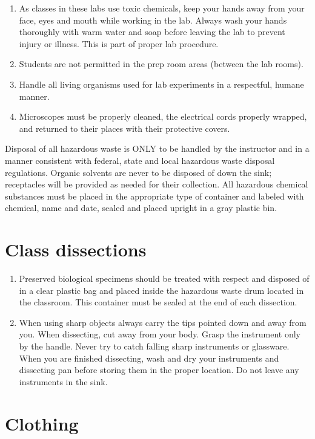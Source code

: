 \documentclass[]{book}
\providecommand{\tightlist}{%
  \setlength{\itemsep}{0pt}\setlength{\parskip}{0pt}}
\theoremstyle{definition}
\theoremstyle{definition}
\theoremstyle{definition}
\theoremstyle{remark}
\begin{document}
\begin{enumerate}
\item
  As classes in these labs use toxic chemicals, keep your hands away
  from your face, eyes and mouth while working in the lab. Always wash
  your hands thoroughly with warm water and soap before leaving the lab
  to prevent injury or illness. This is part of proper lab procedure.
\item
  Students are not permitted in the prep room areas (between the lab
  rooms).
\item
  Handle all living organisms used for lab experiments in a respectful,
  humane manner.
\item
  Microscopes must be properly cleaned, the electrical cords properly
  wrapped, and returned to their places with their protective covers.
\end{enumerate}

Disposal of all hazardous waste is ONLY to be handled by the instructor
and in a manner consistent with federal, state and local hazardous waste
disposal regulations. Organic solvents are never to be disposed of down
the sink; receptacles will be provided as needed for their collection.
All hazardous chemical substances must be placed in the appropriate type
of container and labeled with chemical, name and date, sealed and placed
upright in a gray plastic bin.

\section{Class dissections}\label{class-dissections}

\begin{enumerate}
\def\labelenumi{\arabic{enumi}.}
\setcounter{enumi}{13}
\tightlist
\item
  Preserved biological specimens should be treated with respect and
  disposed of in a clear plastic bag and placed inside the hazardous
  waste drum located in the classroom. This container must be sealed at
  the end of each dissection.
\item
  When using sharp objects always carry the tips pointed down and away
  from you. When dissecting, cut away from your body. Grasp the
  instrument only by the handle. Never try to catch falling sharp
  instruments or glassware. When you are finished dissecting, wash and
  dry your instruments and dissecting pan before storing them in the
  proper location. Do not leave any instruments in the sink.
\end{enumerate}

\section{Clothing}\label{clothing}
\end{document}
